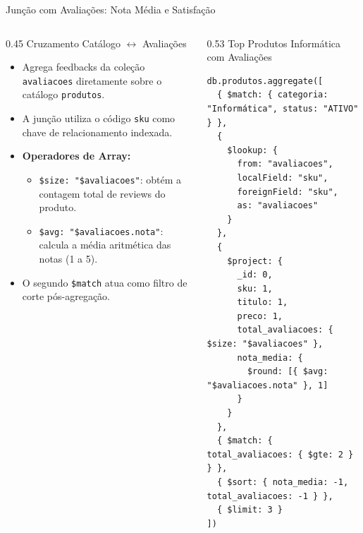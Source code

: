 \begin{frame}[fragile]{Junção com Avaliações: Nota Média e Satisfação}
  \vspace{-0.5cm}
  \begin{columns}[t,onlytextwidth]
    \begin{column}{0.45\textwidth}
      \alert{Cruzamento Catálogo $\leftrightarrow$ Avaliações}\par
      \footnotesize
      \begin{itemize}
        \item Agrega feedbacks da coleção \texttt{avaliacoes} diretamente sobre o catálogo \texttt{produtos}.
        \item A junção utiliza o código \lstinline[language=mongosh, basicstyle=\footnotesize\ttfamily]|sku| como chave de relacionamento indexada.
        \item \textbf{Operadores de Array:}
          \begin{itemize}\footnotesize
            \item \lstinline[language=mongosh, basicstyle=\scriptsize\ttfamily]|$size: "$avaliacoes"|: obtém a contagem total de reviews do produto.
            \item \lstinline[language=mongosh, basicstyle=\scriptsize\ttfamily]|$avg: "$avaliacoes.nota"|: calcula a média aritmética das notas (1 a 5).
          \end{itemize}
        \item O segundo \texttt{\$match} atua como filtro de corte pós-agregação.
      \end{itemize}
    \end{column}
    \begin{column}{0.53\textwidth}
      \alert{Top Produtos Informática com Avaliações}\par
      \vspace{0.05cm}
      \begin{lstlisting}[language=mongosh, basicstyle=\fontsize{6.2pt}{6.9pt}\ttfamily]
db.produtos.aggregate([
  { $match: { categoria: "Informática", status: "ATIVO" } },
  {
    $lookup: {
      from: "avaliacoes",
      localField: "sku",
      foreignField: "sku",
      as: "avaliacoes"
    }
  },
  {
    $project: {
      _id: 0,
      sku: 1,
      titulo: 1,
      preco: 1,
      total_avaliacoes: { $size: "$avaliacoes" },
      nota_media: {
        $round: [{ $avg: "$avaliacoes.nota" }, 1]
      }
    }
  },
  { $match: { total_avaliacoes: { $gte: 2 } } },
  { $sort: { nota_media: -1, total_avaliacoes: -1 } },
  { $limit: 3 }
])
      \end{lstlisting}
    \end{column}
  \end{columns}
\end{frame}

